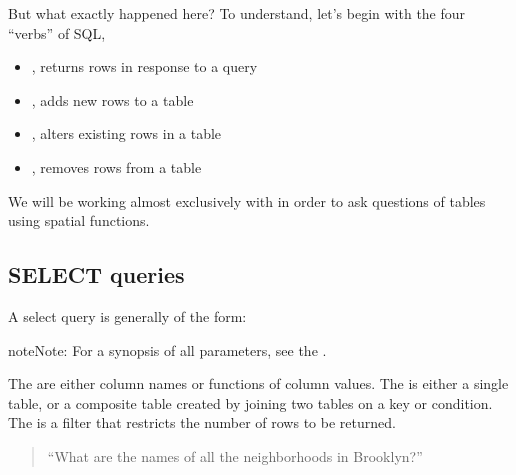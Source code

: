 \documentclass[a4paper,11pt,english]{sphinxmanual}
\begin{document}
But what exactly happened here?  To understand, let’s begin with the four “verbs” of SQL,
\begin{itemize}
\item {} 
, returns rows in response to a query

\item {} 
, adds new rows to a table

\item {} 
, alters existing rows in a table

\item {} 
, removes rows from a table

\end{itemize}

We will be working almost exclusively with  in order to ask questions of tables using spatial functions.


\subsection{SELECT queries}
\label{\detokenize{basic:select-queries}}
A select query is generally of the form:

\begin{sphinxVerbatim}[commandchars=\\\{\}]
     
\end{sphinxVerbatim}

\begin{sphinxadmonition}{note}{Note:}
For a synopsis of all  parameters, see the .
\end{sphinxadmonition}

The  are either column names or functions of column values. The  is either a single table, or a composite table created by joining two tables on a key or condition. The  is a filter that restricts the number of rows to be returned.
\begin{quote}

“What are the names of all the neighborhoods in Brooklyn?”
\end{quote}
\end{document}
